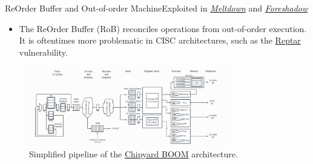 \begin{frame}{ReOrder Buffer and Out-of-order Machine}{Exploited in \href{https://meltdownattack.com/meltdown.pdf}{\color{pink}\textit{Meltdown}} and \href{https://foreshadowattack.eu/foreshadow.pdf}{\color{pink}\textit{Foreshadow}}}
    \begin{itemize}
        \item The ReOrder Buffer (RoB) reconciles operations from out-of-order execution. It is oftentimes more problematic in CISC architectures, such as the \href{https://bughunters.google.com/blog/5997221712101376/the-reptar-cpu-vulnerability}{\color{pink}Reptar} vulnerability.
    \end{itemize}
    \begin{figure}
        \centering
        \includegraphics[width=0.77\textwidth]{images/boom_pipeline_simplified.png}
        \caption{Simplified pipeline of the \href{https://docs.boom-core.org/en/latest/sections/intro-overview/boom-pipeline.html}{\color{pink}Chipyard BOOM} architecture.}
        \label{fig:chipyard-boom-pipeline}
    \end{figure}
\end{frame}

